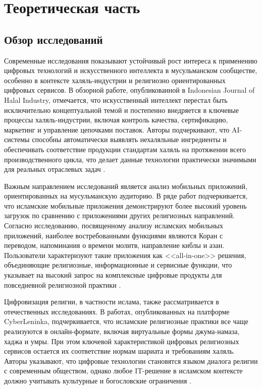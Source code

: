 \FloatBarrier\newpage
\chapter{Теоретическая часть}\label{ch1}


\section{Обзор исследований}


Современные исследования показывают устойчивый рост интереса к применению цифровых технологий и искусственного интеллекта в мусульманском сообществе, особенно в контексте халяль-индустрии и религиозно ориентированных цифровых сервисов. В обзорной работе, опубликованной в Indonesian Journal of Halal Industry, отмечается, что искусственный интеллект перестал быть исключительно концептуальной темой и постепенно внедряется в ключевые процессы халяль-индустрии, включая контроль качества, сертификацию, маркетинг и управление цепочками поставок. Авторы подчеркивают, что AI-системы способны автоматически выявлять нехаляльные ингредиенты и обеспечивать соответствие продукции стандартам халяль на протяжении всего производственного цикла, что делает данные технологии практически значимыми для реальных отраслевых задач \cite{ref8}.


Важным направлением исследований является анализ мобильных приложений, ориентированных на мусульманскую аудиторию. В ряде работ подчеркивается, что исламские мобильные приложения демонстрируют более высокий уровень загрузок по сравнению с приложениями других религиозных направлений. Согласно исследованию, посвященному анализу исламских мобильных приложений, наиболее востребованными функциями являются Коран с переводом, напоминания о времени молитв, направление киблы и азан. Пользователи характеризуют такие приложения как <<all-in-one>> решения, объединяющие религиозные, информационные и сервисные функции, что указывает на высокий запрос на комплексные цифровые продукты для повседневной религиозной практики \cite{ref9}.


Цифровизация религии, в частности ислама, также рассматривается в отечественных исследованиях. В работах, опубликованных на платформе CyberLeninka, подчеркивается, что исламские религиозные практики все чаще реализуются в онлайн-формате, включая виртуальные формы джума-намаза, хаджа и умры. При этом ключевой характеристикой цифровых религиозных сервисов остается их соответствие нормам шариата и требованиям халяль. Авторы указывают, что цифровые технологии становятся языком диалога религии с современным обществом, однако любое IT-решение в исламском контексте должно учитывать культурные и богословские ограничения \cite{ref10,ref11}.


